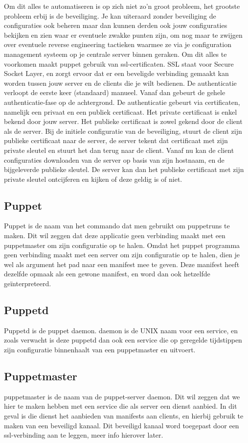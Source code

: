 Om dit alles te automatiseren is op zich niet zo'n groot probleem, het grootste probleem erbij is de beveiliging. Je kan uiteraard zonder beveiliging de configuraties ook beheren maar dan kunnen derden ook jouw configuraties bekijken en zien waar er eventuele zwakke punten zijn, om nog maar te zwijgen over eventuele reverse engineering tactieken waarmee ze via je configuration management systeem op je centrale server binnen geraken. Om dit alles te voorkomen maakt puppet gebruik van ssl-certificaten. SSL staat voor Secure Socket Layer, en zorgt ervoor dat er een beveligde verbinding gemaakt kan worden tussen jouw server en de clients die je wilt bedienen. De authenticatie verloopt de eerste keer (standaard) manueel. Vanaf dan gebeurt de gehele authenticatie-fase op de achtergrond. De authenticatie gebeurt via certificaten, namelijk een privaat en een publiek certificaat. Het private certificaat is enkel bekend door jouw server. Het publieke certificaat is zowel gekend door de client als de server. Bij de initiele configuratie van de beveiliging, stuurt de client zijn publieke certificaat naar de server, de server tekent dat certificaat met zijn private sleutel en stuurt het dan terug naar de client. Vanaf nu kan de client configuraties downloaden van de server op basis van zijn hostnaam, en de bijgeleverde publieke sleutel. De server kan dan het publieke certificaat met zijn private sleutel ontcijferen en kijken of deze geldig is of niet.

\subsection{Puppet}
Puppet is de naam van het commando dat men gebruikt om puppetruns te maken. Dit wil zeggen dat deze applicatie geen verbinding maakt met een puppetmaster om zijn configuratie op te halen. Omdat het puppet programma geen verbinding maakt met een server om zijn configuratie op te halen, dien je wel als argument het pad naar een manifest mee te geven. Deze manifest heeft dezelfde opmaak als een gewone manifest, en word dan ook hetzelfde geïnterpreteerd.

\subsection{Puppetd}
Puppetd is de puppet daemon. daemon is de UNIX naam voor een service, en zoals verwacht is deze puppetd dan ook een service die op geregelde tijdstippen zijn configuratie binnenhaalt van een puppetmaster en uitvoert.

\subsection{Puppetmaster}
puppetmaster is de naam van de puppet-server daemon. Dit wil zeggen dat we hier te maken hebben met een service die als server een dienst aanbied. In dit geval is die dienst het aanbieden van manifests aan clients, en hierbij gebruik te maken van een beveiligd kanaal. Dit beveiligd kanaal word toegepast door een ssl-verbinding aan te leggen, meer info hierover later.
